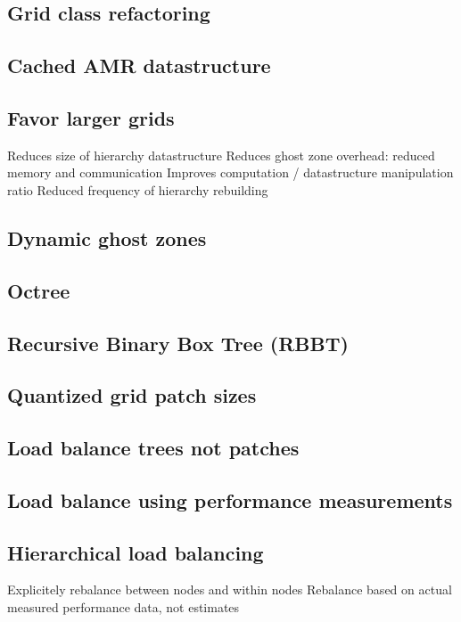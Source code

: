 \documentclass{article}
\begin{document}
\subsection{Grid class refactoring} \label{solution:amr-grid-refactor}
\subsection{Cached AMR datastructure}  \label{solution:amr-cache}
\subsection{Favor larger grids}\label{solution:amr-large-grids}
   Reduces size of hierarchy datastructure
   Reduces ghost zone overhead: reduced memory and communication
   Improves computation / datastructure manipulation ratio
   Reduced frequency of hierarchy rebuilding
\subsection{Dynamic ghost zones} \label{solution:amr-dynamic-ghosts}
\subsection{Octree} \label{solution:amr-octree}
\subsection{Recursive Binary Box Tree (RBBT)}  \label{solution:amr-boxtree}
\subsection{Quantized grid patch sizes} \label{solution:amr-grid-quantized}
\subsection{Load balance trees not patches} \label{solution:amr-balance-trees}
\subsection{Load balance using performance measurements}  \label{solution:amr-balance-performance}
\subsection{Hierarchical load balancing}\label{solution:amr-balance-hierarchical}
   Explicitely rebalance between nodes and within nodes 
   Rebalance based on actual measured performance data, not estimates
\end{document}
